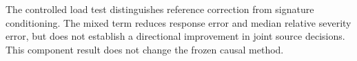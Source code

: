 The controlled load test distinguishes reference correction from signature conditioning. The mixed term reduces response error and median relative severity error, but does not establish a directional improvement in joint source decisions. This component result does not change the frozen causal method.
